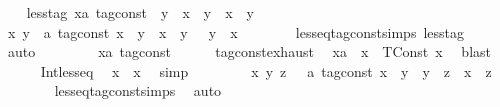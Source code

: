 \begin{isabellebody}
\isanewline
\ \ \isamarkupfalse%
\ less{\isacharunderscore}tag{\isacharcolon}\ {\isacartoucheopen}{\isacharparenleft}x{\isacharcolon}{\isacharcolon}{\isacharprime}a\ tag{\isacharunderscore}const{\isacharparenright}\ {\isacharless}\ y\ {\isasymlongleftrightarrow}\ {\isacharparenleft}x\ {\isasymle}\ y{\isacharparenright}\ {\isasymand}\ {\isacharparenleft}x\ {\isasymnoteq}\ y{\isacharparenright}{\isacartoucheclose}\isanewline
\isanewline
\ \ \isamarkupfalse%
%
\isadelimproof
\ %
\endisadelimproof
%
\isatagproof
{}\isamarkupfalse%
\isanewline
\ \ \ \ \isamarkupfalse%
\ {\isacartoucheopen}{\isasymAnd}x\ y\ {\isacharcolon}{\isacharcolon}\ {\isacharprime}a\ tag{\isacharunderscore}const{\isachardot}\ {\isacharparenleft}x\ {\isacharless}\ y{\isacharparenright}\ {\isacharequal}\ {\isacharparenleft}x\ {\isasymle}\ y\ {\isasymand}\ {\isasymnot}\ y\ {\isasymle}\ x{\isacharparenright}{\isacartoucheclose}\isanewline
\ \ \ \ \ \ \isamarkupfalse%
\ less{\isacharunderscore}eq{\isacharunderscore}tag{\isacharunderscore}const{\isachardot}simps\ less{\isacharunderscore}tag\ \isamarkupfalse%
\ auto\isanewline
\ \ \isamarkupfalse%
\isanewline
\ \ \ \ \isamarkupfalse%
\ x{\isacharcolon}{\isacharcolon}{\isacartoucheopen}{\isacharprime}a\ tag{\isacharunderscore}const{\isacartoucheclose}\isanewline
\ \ \ \ \isamarkupfalse%
\ tag{\isacharunderscore}const{\isachardot}exhaust\ \isamarkupfalse%
\ xa\ \ {\isacartoucheopen}x\ {\isacharequal}\ TConst\ x\ \isamarkupfalse%
\ blast\isanewline
\ \ \ \ \isamarkupfalse%
\ Int{\isacharunderscore}less{\isacharunderscore}eq\ \isamarkupfalse%
\ {\isacartoucheopen}x\ {\isasymle}\ x{\isacartoucheclose}\ \isamarkupfalse%
\ simp\isanewline
\ \ \isamarkupfalse%
\isanewline
\ \ \ \ \isamarkupfalse%
\ {\isacartoucheopen}{\isasymAnd}x\ y\ z\ \ {\isacharcolon}{\isacharcolon}\ {\isacharprime}a\ tag{\isacharunderscore}const{\isachardot}\ x\ {\isasymle}\ y\ {\isasymLongrightarrow}\ y\ {\isasymle}\ z\ {\isasymLongrightarrow}\ x\ {\isasymle}\ z{\isacartoucheclose}\isanewline
\ \ \ \ \ \ \isamarkupfalse%
\ less{\isacharunderscore}eq{\isacharunderscore}tag{\isacharunderscore}const{\isachardot}simps\ \isamarkupfalse%
\ auto\isanewline

\end{isabellebody}
